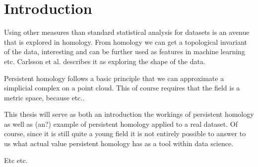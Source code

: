 \chapter{Introduction}
Using other measures than standard statistical analysis for datasets is an avenue that is explored in homology. From homology we can get a topological invariant of the data, interesting and can be further used as features in machine learning etc. Carlsson et al. describes it as exploring the shape of the data.

Persistent homology follows a basic principle that we can approximate a simplicial complex on a point cloud. This of course requires that the field is a metric space, because etc..

This thesis will serve as both an introduction the workings of persistent homology as well as (an?) example of persistent homology applied to a real dataset. Of course, since it is still quite a young field it is not entirely possible to answer to us what actual value persistent homology has as a tool within data science.

Etc etc.


